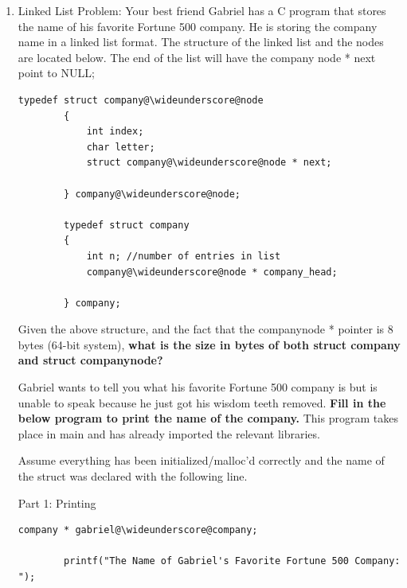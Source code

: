 \documentclass{article}
\newcommand{\wideunderscore}{\underline{\hphantom{n}}}
\begin{document}
\begin{enumerate}[label=(\alph*), itemsep = 120pt]
\begin{lstlisting}[style=CStyle]
    \end{lstlisting}

    Let’s say we have a void pointer p. What is the difference between delete [] p and delete p?



    \item Linked List Problem:
    Your best friend Gabriel has a C program that stores the name of his favorite Fortune 500 company. He is storing the company name in a linked list format. The structure of the linked list and the nodes are located below. The end of the list will have the company \wideunderscore node * next point to NULL;

    \begin{lstlisting}[style = CStyle]
        typedef struct company@\wideunderscore@node
        {
            int index;
            char letter;
            struct company@\wideunderscore@node * next;
            
        } company@\wideunderscore@node;

        typedef struct company
        {
            int n; //number of entries in list
            company@\wideunderscore@node * company_head;
            
        } company;
    \end{lstlisting}

    Given the above structure, and the fact that the company\wideunderscore node * pointer is 8 bytes (64-bit system),
    \textbf{what is the size in bytes of both struct company and struct company\wideunderscore node?}


    \vspace{2.5cm} %
    
    Gabriel wants to tell you what his favorite Fortune 500 company is but is unable to speak because he just got his wisdom teeth removed. \textbf{Fill in the below program to print the name of the company.} This program takes place in main and has already imported the relevant libraries. 

    Assume everything has been initialized/malloc'd correctly and the name of the struct was declared with the following line. 

    Part 1: Printing

    \begin{lstlisting}[style = CStyle]
        company * gabriel@\wideunderscore@company;

        printf("The Name of Gabriel's Favorite Fortune 500 Company: ");


\end{lstlisting}
\end{enumerate}
\end{document}
